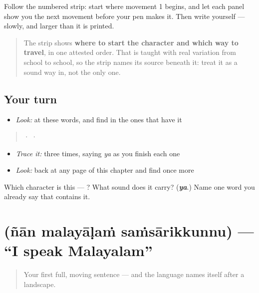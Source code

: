 Follow the numbered strip: start where movement 1 begins, and let each panel show you the next movement before your pen makes it. Then write  yourself — slowly, and larger than it is printed.

\begin{quote}
The strip shows \textbf{where to start the character and which way to travel}, in one attested order. That is taught with real variation from school to school, so the strip names its source beneath it: treat it as a sound way in, not the only one.
\end{quote}

\subsection*{Your turn}
\begin{itemize}
\raggedright
  \item \emph{Look:} at these words, and find  in the ones that have it
\end{itemize}

\begin{quote}
   ·    ·  
\end{quote}

\begin{itemize}
\raggedright
  \item \emph{Trace it:}  three times, saying \emph{ya} as you finish each one
  \item \emph{Look:} back at any page of this chapter and find  once more
\end{itemize}

\begin{tcolorbox}[breakable,colback=teal!4,colframe=teal!35!black,title={Before you move on}]
Which character is this — ? What sound does it carry? (\emph{\textbf{ya}}.) Name one word you already say that contains it.
\end{tcolorbox}
\section[\texorpdfstring{\ml{ഞാൻ} \ml{മലയാളം} … (ñān malayāḷaṁ …)}{ഞാൻ മലയാളം … (ñān malayāḷaṁ …)}]{   (ñān malayāḷaṁ saṁsārikkunnu) — \textquotedblleft{}I speak Malayalam\textquotedblright{}}

\label{lesson:ML-C05-njaan-malayalam-samsaarikkunnu}



\begin{quote}
Your first full, moving sentence — and the language names itself after a landscape.
\end{quote}


